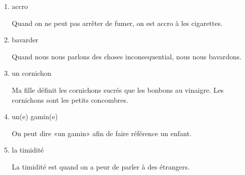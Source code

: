\documentclass[letterpaper]{article}
\begin{document}
\doublespacing
\begin{enumerate}
\item accro

Quand on ne peut pas arrêter de fumer, on est accro à les cigarettes.
\item bavarder

Quand nous nous parlons des choses inconsequential, nous nous bavardons.
\item un cornichon

Ma fille définit les cornichons sucrés que les bonbons au vinaigre. Les cornichons sont les petits concombres.

\item un(e) gamin(e)

On peut dire «un gamin» afin de faire référence un enfant.

\item la timidité

La timidité est quand on a peur de parler à des étrangers.
\end{enumerate}
\end{document}

